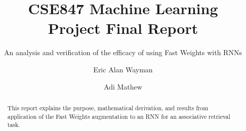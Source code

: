 \documentclass[siggraph, review=false]{acmart}
\begin{document}
\title{CSE847 Machine Learning \\ Project Final Report}
\subtitle{An analysis and verification of the efficacy of using Fast Weights with RNNs}

\author{Eric Alan Wayman}

\author{Adi Mathew}

\begin{abstract}
This report explains the purpose, mathematical derivation, and results from application of the Fast Weights augmentation \cite{DBLP:conf/nips/BaHMLI16} to an RNN for an associative retrieval task.
\end{abstract}



\maketitle

% 





\end{document}
